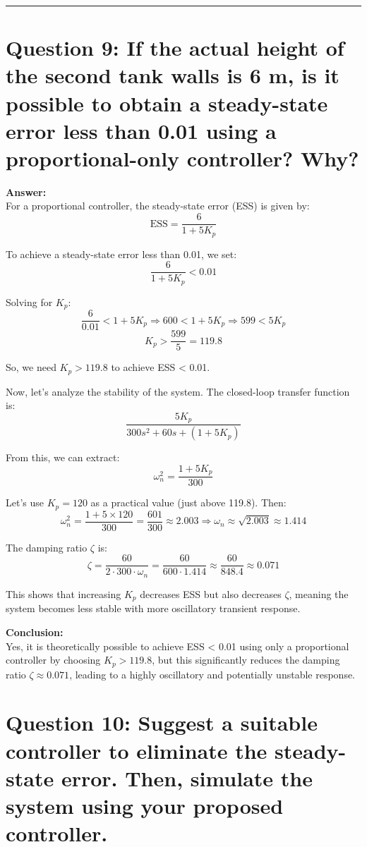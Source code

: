\documentclass{report}
\begin{document}
\begin{flushleft}
\noindent\rule{\linewidth}{0.4pt}

\section*{Question 9: If the actual height of the second tank walls is 6 m, is it possible to obtain a steady-state error less than 0.01 using a proportional-only controller? Why?}


\textbf{Answer:} \\

For a proportional controller, the steady-state error (ESS) is given by:
\[
\text{ESS} = \frac{6}{1 + 5K_p}
\]

To achieve a steady-state error less than 0.01, we set:
\[
\frac{6}{1 + 5K_p} < 0.01
\]

Solving for \( K_p \):
\[
\frac{6}{0.01} < 1 + 5K_p \Rightarrow 600 < 1 + 5K_p \Rightarrow 599 < 5K_p
\]
\[
K_p > \frac{599}{5} = 119.8
\]

So, we need \( K_p > 119.8 \) to achieve ESS < 0.01.

Now, let's analyze the stability of the system. The closed-loop transfer function is:
\[
\frac{5K_p}{300s^2 + 60s + (1 + 5K_p)}
\]

From this, we can extract:
\[
\omega_n^2 = \frac{1 + 5K_p}{300}
\]

Let’s use \( K_p = 120 \) as a practical value (just above 119.8). Then:
\[
\omega_n^2 = \frac{1 + 5 \times 120}{300} = \frac{601}{300} \approx 2.003 \Rightarrow \omega_n \approx \sqrt{2.003} \approx 1.414
\]

The damping ratio \( \zeta \) is:
\[
\zeta = \frac{60}{2 \cdot 300 \cdot \omega_n} = \frac{60}{600 \cdot 1.414} \approx \frac{60}{848.4} \approx 0.071
\]

This shows that increasing \( K_p \) decreases ESS but also decreases \( \zeta \), meaning the system becomes less stable with more oscillatory transient response.

\textbf{Conclusion:} \\
Yes, it is theoretically possible to achieve ESS < 0.01 using only a proportional controller by choosing \( K_p > 119.8 \), but this significantly reduces the damping ratio \( \zeta \approx 0.071 \), leading to a highly oscillatory and potentially unstable response.


\newpage
\section*{Question 10: Suggest a suitable controller to eliminate the steady-state error. Then, simulate the system using your proposed controller.}


\end{flushleft}
\end{document}
